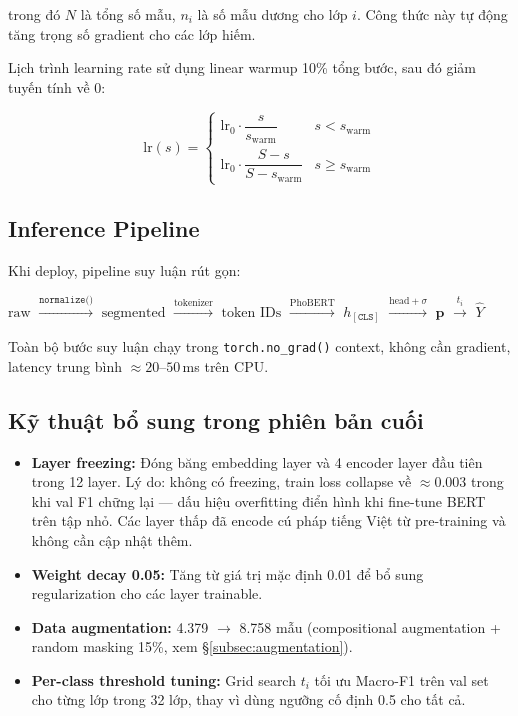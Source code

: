 \documentclass[12pt, a4paper]{report}
\begin{document}
trong đó $N$ là tổng số mẫu, $n_i$ là số mẫu dương cho lớp $i$.
Công thức này tự động tăng trọng số gradient cho các lớp hiếm.

Lịch trình learning rate sử dụng linear warmup 10\% tổng bước, sau đó giảm tuyến tính về 0:

\begin{equation}
  \text{lr}(s) =
  \begin{cases}
    \text{lr}_0 \cdot \dfrac{s}{s_\mathrm{warm}} & s < s_\mathrm{warm} \\[6pt]
    \text{lr}_0 \cdot \dfrac{S - s}{S - s_\mathrm{warm}} & s \geq s_\mathrm{warm}
  \end{cases}
\label{eq:lr_schedule}
\end{equation}

\subsection{Inference Pipeline}
\label{subsec:approach3_inference}

Khi deploy, pipeline suy luận rút gọn:

\begin{center}
$\text{raw}$
$\xrightarrow{\texttt{normalize()}}$
$\text{segmented}$
$\xrightarrow{\text{tokenizer}}$
$\text{token IDs}$
$\xrightarrow{\text{PhoBERT}}$
$h_{[\texttt{CLS}]}$
$\xrightarrow{\text{head}+\sigma}$
$\mathbf{p}$
$\xrightarrow{t_i}$
$\hat{Y}$
\end{center}

Toàn bộ bước suy luận chạy trong \texttt{torch.no\_grad()} context,
không cần gradient, latency trung bình $\approx 20$--$50$\,ms trên CPU.

\subsection{Kỹ thuật bổ sung trong phiên bản cuối}
\label{subsec:approach3_tricks}

\begin{itemize}
  \item \textbf{Layer freezing:} Đóng băng embedding layer
        và 4 encoder layer đầu tiên trong 12 layer.
        Lý do: không có freezing, train loss collapse về $\approx 0.003$
        trong khi val F1 chững lại --- dấu hiệu overfitting điển hình
        khi fine-tune BERT trên tập nhỏ.
        Các layer thấp đã encode cú pháp tiếng Việt từ pre-training
        và không cần cập nhật thêm.
  \item \textbf{Weight decay 0.05:} Tăng từ giá trị mặc định 0.01
        để bổ sung regularization cho các layer trainable.
  \item \textbf{Data augmentation:} 4.379 $\rightarrow$ 8.758 mẫu
        (compositional augmentation + random masking 15\%, xem §\ref{subsec:augmentation}).
  \item \textbf{Per-class threshold tuning:} Grid search $t_i$
        tối ưu Macro-F1 trên val set cho từng lớp trong 32 lớp,
        thay vì dùng ngưỡng cố định 0.5 cho tất cả.
\end{itemize}
\end{document}
